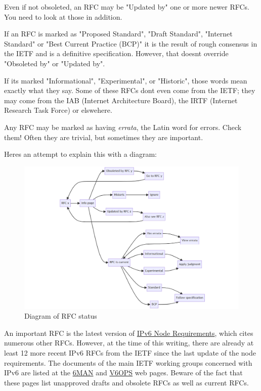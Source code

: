 \documentclass[
]{article}
\begin{document}
Even if not obsoleted, an RFC may be "Updated by" one or more newer
RFCs. You need to look at those in addition.

If an RFC is marked as "Proposed Standard", "Draft Standard", "Internet
Standard" or "Best Current Practice (BCP)" it is the result of rough
consensus in the IETF and is a definitive specification. However, that
doesn\textquotesingle t override "Obsoleted by" or "Updated by".

If it\textquotesingle s marked "Informational", "Experimental", or
"Historic", those words mean exactly what they say. Some of these RFCs
don\textquotesingle t even come from the IETF; they may come from the
IAB (Internet Architecture Board), the IRTF (Internet Research Task
Force) or elswehere.

Any RFC may be marked as having \emph{errata}, the Latin word for
errors. Check them! Often they are trivial, but sometimes they are
important.

Here\textquotesingle s an attempt to explain this with a diagram:

\begin{figure}
\centering
\includegraphics{rfc-diagram.png}
\caption{Diagram of RFC status}
\end{figure}

An important RFC is the latest version of
\href{https://www.rfc-editor.org/info/bcp220}{IPv6 Node Requirements},
which cites numerous other RFCs. However, at the time of this writing,
there are already at least 12 more recent IPv6 RFCs from the IETF since
the last update of the node requirements. The documents of the main IETF
working groups concerned with IPv6 are listed at the
\href{https://datatracker.ietf.org/wg/6man/documents/}{6MAN} and
\href{https://datatracker.ietf.org/wg/v6ops/documents/}{V6OPS} web
pages. Beware of the fact that these pages list unapproved drafts and
obsolete RFCs as well as current RFCs.
\end{document}
